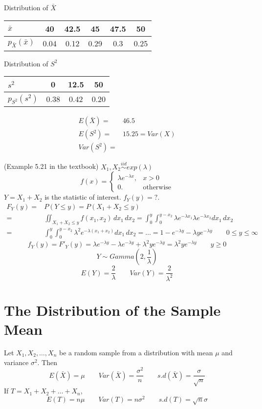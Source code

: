 \begin{exmp}
Distribution of $\bar{X}$
\begin{center}
\begin{tabular}{l|c|c|c|c|c}
\hline
$\bar{x}$ & 40 & 42.5 & 45 & 47.5 & 50\\
\hline
$p_{\bar{X}}(\bar{x})$ & 0.04 & 0.12 & 0.29 & 0.3 & 0.25 \\
\hline
\end{tabular}
\end{center}

Distribution of $S^2$
\begin{center}
\begin{tabular}{l|c|c|c}
\hline
$s^2$ & 0 & 12.5 & 50\\
\hline
$p_{S^2}(s^2)$ & 0.38 & 0.42 & 0.20 \\
\hline
\end{tabular}
\end{center}
\begin{align*}
E(\bar{X})=& 46.5 \\
E(S^2)=& 15.25 = Var(X) \\
Var(S^2)=&
\end{align*}
\end{exmp}

\begin{exmp}
(Example 5.21 in the textbook)
$X_1,X_2 \overset{iid}{\sim}exp(\lambda)$
\[f(x)=\begin{cases}
\lambda e^{-\lambda x}, 	& x >0\\
0. &\text{otherwise}
\end{cases}\]
$Y=X_1+X_2$ is the statistic of interest. $f_Y(y)=?$.
\begin{align*}
F_Y(y)=&P(Y \leq y)=P(X_1+X_2\leq y) \\
=&\iint_{X_1+X_2\leq y} f(x_1,x_2) \,dx_1 \,dx_2 =\int_0^y \int_0^{y-x_2} \lambda e^{-\lambda x_1} \lambda e^{-\lambda x_2} dx_1 \, dx_2 \\
=& \int_0^y \int_0^{y-x_2} \lambda^2 e^{-\lambda(x_1+x_2)} dx_1 \, dx_2= \dots = 1-e^{-\lambda y}- \lambda y e^{-\lambda y} \qquad 0\leq y \leq \infty
\end{align*}
\[f_Y(y)=F'_Y(y)=\lambda e^{-\lambda y} -\lambda e^{-\lambda y}+\lambda^2 y e^{-\lambda y} =\lambda^2 y e^{-\lambda y} \qquad y \geq 0 \]
\[Y\sim Gamma(2,\frac{1}{\lambda})\]
\[E(Y)=\frac{2}{\lambda} \qquad Var(Y)=\frac{2}{\lambda^2}\]
\end{exmp}

\section{The Distribution of the Sample Mean}
\begin{prop}
Let $X_1, X_2, \dots , X_n$ be a random sample from a distribution with mean $\mu$ and variance $\sigma^2$. Then 
\[E(\bar{X})=\mu \qquad  Var(\bar{X})=\frac{\sigma^2}{n} \qquad s.d(\bar{X})=\frac{\sigma}{\sqrt{n}}\]
If $T=X_1+ X_2+ \dots + X_n$,
\[E(T)=n \mu \qquad  Var(T)=n\sigma^2 \qquad s.d(T)=\sqrt{n}\sigma\]
\end{prop}

